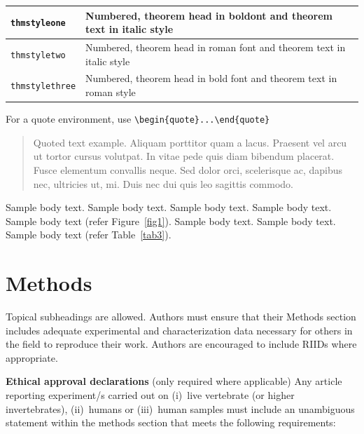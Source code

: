 \documentclass[sn-mathphys]{sn-jnl}%
\begin{document}
\bigskip
\begin{tabular}{|l|p{19pc}|}
\hline
\verb+thmstyleone+ & Numbered, theorem head in boldont and theorem text in italic style \\\hline
\verb+thmstyletwo+ & Numbered, theorem head in roman font and theorem text in italic style \\\hline
\verb+thmstylethree+ & Numbered, theorem head in bold font and theorem text in roman style \\\hline
\end{tabular}
\bigskip


For a quote environment, use \verb+\begin{quote}...\end{quote}+
\begin{quote}
Quoted text example. Aliquam porttitor quam a lacus. Praesent vel arcu ut tortor cursus volutpat. In vitae pede quis diam bibendum placerat. Fusce elementum
convallis neque. Sed dolor orci, scelerisque ac, dapibus nec, ultricies ut, mi. Duis nec dui quis leo sagittis commodo.
\end{quote}

Sample body text. Sample body text. Sample body text. Sample body text. Sample body text (refer Figure~\ref{fig1}). Sample body text. Sample body text. Sample body text (refer Table~\ref{tab3}). 

\section{Methods}\label{sec11}

Topical subheadings are allowed. Authors must ensure that their Methods section includes adequate experimental and characterization data necessary for others in the field to reproduce their work. Authors are encouraged to include RIIDs where appropriate. 

\textbf{Ethical approval declarations} (only required where applicable) Any article reporting experiment/s carried out on (i)~live vertebrate (or higher invertebrates), (ii)~humans or (iii)~human samples must include an unambiguous statement within the methods section that meets the following requirements: 
\end{document}
